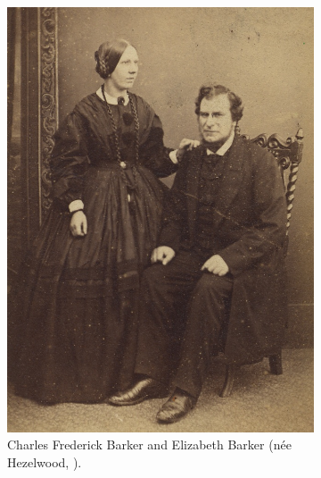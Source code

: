 \begin{figure}
	\centering
	\begin{subfigure}{.48\textwidth}
		\label{Charles_Frederick_Barker_and_Elizabeth_Hezelwood}
		\includegraphics{photos/Charles_Frederick_Barker_and_Elizabeth_Hezelwood}
		\caption{Charles Frederick Barker and Elizabeth Barker (n\'{e}e Hezelwood, ).}
	\end{subfigure}
	\begin{subfigure}{.48\textwidth}

\end{subfigure}
\end{figure}
